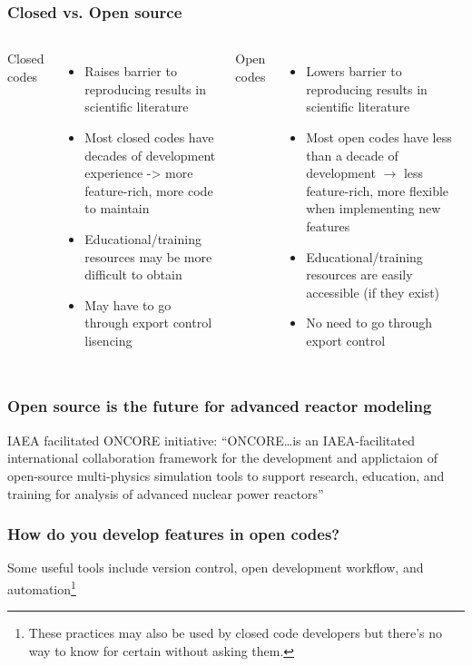 \begin{frame}
    \frametitle{Closed vs. Open source}
    \begin{columns}
        \column[t]{5cm}
        Closed codes
        \begin{itemize}
            \item Raises barrier to reproducing results in scientific literature
            \item Most closed codes have decades of development experience -> more feature-rich, more code to maintain
            \item Educational/training resources may be more difficult to obtain
            \item May have to go through export control lisencing
        \end{itemize}


        \column[t]{5cm}
        Open codes
        \begin{itemize}
            \item Lowers barrier to reproducing results in scientific literature
            \item Most open codes have less than a decade of development $\rightarrow$ less feature-rich, more flexible when implementing new features
            \item Educational/training resources are easily accessible (if they exist)
            \item No need to go through export control
        \end{itemize}
    \end{columns}

    \end{frame}

\begin{frame}
    \frametitle{Open source is the future for advanced reactor modeling}
    \Gls{IAEA} facilitated \Gls{ONCORE} initiative\cite{fiorina_initiative_2021}:
    \newline
    \newline
    \noindent ``ONCORE\ldots is an IAEA-facilitated international collaboration framework for the development and applictaion of open-source multi-physics simulation tools to support research, education, and training for analysis of advanced nuclear power reactors''\cite{iaea_open-source}

\end{frame}

\begin{frame}[t]
    \frametitle{How do you develop features in open codes?}
    Some useful tools include version control, open development workflow, and automation\footnote{These practices may also be used by closed code developers but there's no way to know for certain without asking them.}
    
\end{frame}
